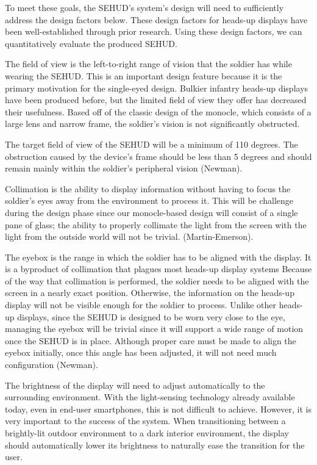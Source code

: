 To meet these goals, the SEHUD's system's design will need to sufficiently
address the design factors below. These design factors for heads-up displays
have been well-established through prior research. Using these design factors,
we can quantitatively evaluate the produced SEHUD.



The field of view is the left-to-right range of vision that the soldier has while
wearing the SEHUD. This is an important design feature because it is the
primary motivation for the single-eyed design. Bulkier infantry heads-up
displays have been produced before, but the limited field of view they offer
has decreased their usefulness. Based off of the classic design of the monocle,
which consists of a large lens and narrow frame, the soldier's vision is not
significantly obstructed.

The target field of view of the SEHUD will be a minimum of 110 degrees. The
obstruction caused by the device's frame should be less than 5 degrees and
should remain mainly within the soldier's peripheral vision (Newman).


Collimation is the ability to display information without having to focus the
soldier's eyes away from the environment to process it. This will be challenge
during the design phase since our monocle-based design will consist of a single
pane of glass; the ability to properly collimate the light from the screen with
the light from the outside world will not be trivial.
(Martin-Emerson).


The eyebox is the range in which the soldier has to be aligned with the display.
It is a byproduct of collimation that plagues most heads-up display systems
Because of the way that collimation is performed, the soldier needs to be aligned
with the screen in a nearly exact position. Otherwise, the information on the
heads-up display will not be visible enough for the soldier to process. Unlike other
heads-up displays, since the SEHUD is designed to be worn very close to the
eye, managing the eyebox will be trivial since it will support a wide range of
motion once the SEHUD is in place. Although proper care must be made to align
the eyebox initially, once this angle has been adjusted, it will not need much
configuration (Newman).


The brightness of the display will need to adjust automatically to the
surrounding environment. With the light-sensing technology already available
today, even in end-user smartphones, this is not difficult to achieve. However,
it is very important to the success of the system. When transitioning between a
brightly-lit outdoor environment to a dark interior environment, the display
should automatically lower its brightness to naturally ease the transition for
the user.


